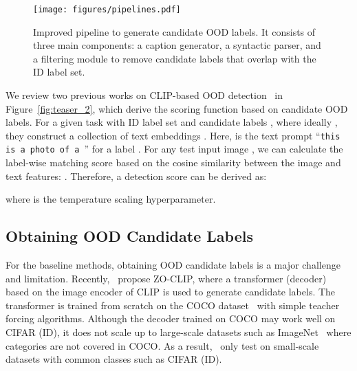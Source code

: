 \documentclass{article}
\begin{document}
\begin{figure*}[!t]
\centering
\texttt{[image: figures/pipelines.pdf]}
\caption{Improved pipeline to generate candidate OOD labels. It consists of three main components: a caption generator, a syntactic parser, and a filtering module to remove candidate labels that overlap with the ID label set.}
\label{fig:pipeline}
\end{figure*}



\label{sec:candidate_label}
We review two previous works on CLIP-based OOD detection~\cite{esmaeilpour2022zero,fort2021exploring} in Figure~\ref{fig:teaser_2}, which derive the scoring function based on candidate OOD labels. For a given task with ID label set  and candidate labels , where ideally , they construct a collection of text embeddings . Here,  is the text prompt ``\texttt{this is a photo of a }''
for a label . For any test input image , we can calculate the label-wise matching score based on the cosine similarity between the image and text features: .
Therefore, a detection score can be derived as:

where  is the temperature scaling hyperparameter. 

\subsection{Obtaining OOD Candidate Labels}
For the baseline methods, obtaining OOD candidate labels is a major challenge and limitation. Recently,~\cite{esmaeilpour2022zero} propose ZO-CLIP, where a transformer (decoder)  based on the image encoder of CLIP is used to generate candidate labels. The transformer is trained from scratch on the  COCO dataset~\cite{lin2014microsoft} with simple teacher forcing algorithms. Although the decoder trained on COCO may work well on CIFAR (ID), it does not scale up to large-scale datasets such as ImageNet~\cite{deng2009imagenet} where categories are not covered in COCO. As a result,~\cite{esmaeilpour2022zero} only test on small-scale datasets with common classes such as CIFAR (ID).
\end{document}
